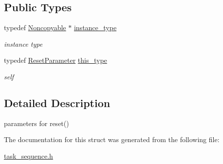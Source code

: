 \subsection*{Public Types}
\begin{DoxyCompactItemize}
\item 
\hypertarget{classhryky_1_1_noncopyable_aaf87abb55f700af85ecb0895f6178821}{typedef \hyperlink{classhryky_1_1_noncopyable}{Noncopyable} $\ast$ \hyperlink{classhryky_1_1_noncopyable_aaf87abb55f700af85ecb0895f6178821}{instance\-\_\-type}}\label{classhryky_1_1_noncopyable_aaf87abb55f700af85ecb0895f6178821}

\begin{DoxyCompactList}\small\item\em instance type \end{DoxyCompactList}\item 
\hypertarget{structhryky_1_1task_1_1_sequence_1_1_reset_parameter_a2edf3eb894e141dc65a6e3dacf004b8e}{typedef \hyperlink{structhryky_1_1task_1_1_sequence_1_1_reset_parameter}{Reset\-Parameter} \hyperlink{structhryky_1_1task_1_1_sequence_1_1_reset_parameter_a2edf3eb894e141dc65a6e3dacf004b8e}{this\-\_\-type}}\label{structhryky_1_1task_1_1_sequence_1_1_reset_parameter_a2edf3eb894e141dc65a6e3dacf004b8e}

\begin{DoxyCompactList}\small\item\em self \end{DoxyCompactList}\end{DoxyCompactItemize}


\subsection{Detailed Description}
parameters for reset() 

The documentation for this struct was generated from the following file\-:\begin{DoxyCompactItemize}
\item 
\hyperlink{task__sequence_8h}{task\-\_\-sequence.\-h}\end{DoxyCompactItemize}
